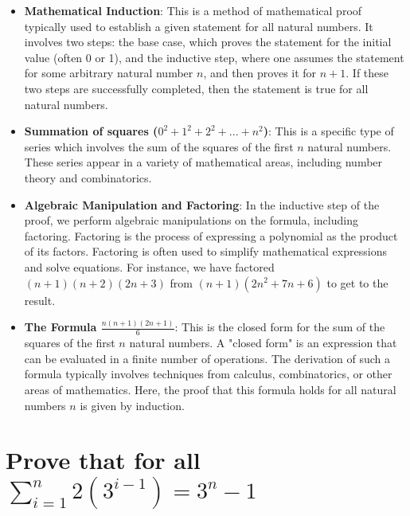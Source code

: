 \documentclass{article}
\begin{document}
\begin{itemize}

    \item {\bf Mathematical Induction}: This is a method of mathematical proof typically used to establish a given statement for all natural numbers. It involves two steps: the base case, which proves the statement for the initial value (often 0 or 1), and the inductive step, where one assumes the statement for some arbitrary natural number $n$, and then proves it for $n+1$. If these two steps are successfully completed, then the statement is true for all natural numbers.
    
    \item {\bf Summation of squares ($0^2 + 1^2 + 2^2 + ... + n^2$)}: This is a specific type of series which involves the sum of the squares of the first $n$ natural numbers. These series appear in a variety of mathematical areas, including number theory and combinatorics. 
    
    \item {\bf Algebraic Manipulation and Factoring}: In the inductive step of the proof, we perform algebraic manipulations on the formula, including factoring. Factoring is the process of expressing a polynomial as the product of its factors. Factoring is often used to simplify mathematical expressions and solve equations. For instance, we have factored $(n+1)(n+2)(2n+3)$ from $(n+1)(2n^2+7n+6)$ to get to the result. 
    
    \item {\bf The Formula $\frac{n(n+1)(2n+1)}{6}$}: This is the closed form for the sum of the squares of the first $n$ natural numbers. A "closed form" is an expression that can be evaluated in a finite number of operations. The derivation of such a formula typically involves techniques from calculus, combinatorics, or other areas of mathematics. Here, the proof that this formula holds for all natural numbers $n$ is given by induction.
    
\end{itemize}

\section{Prove that for all $\sum_{i=1}^{n} 2(3^{i-1}) = 3^n - 1$}
\end{document}
